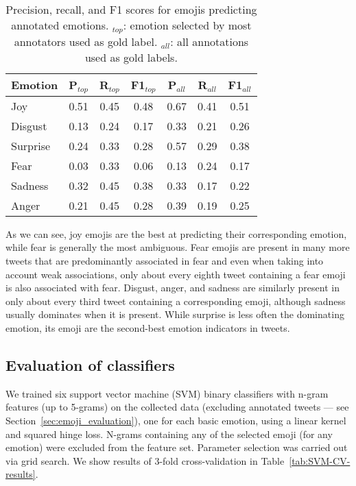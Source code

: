 \documentclass[10pt, a4paper]{article}
\begin{document}
\begin{table}[!ht]
\centering
\begin{tabular}{l | c | c | c | c | c | c}
\textbf{Emotion} & \textbf{P$_{top}$} & \textbf{R$_{top}$} & \textbf{F1$_{top}$} & \textbf{P$_{all}$} & \textbf{R$_{all}$} & \textbf{F1$_{all}$} \\\hline
Joy & 0.51 & 0.45 & 0.48 & 0.67 & 0.41 & 0.51 \\
Disgust & 0.13 & 0.24 & 0.17 & 0.33 & 0.21 & 0.26 \\
Surprise & 0.24 & 0.33 & 0.28 & 0.57 & 0.29 & 0.38 \\
Fear & 0.03 & 0.33 & 0.06 & 0.13 & 0.24 & 0.17 \\
Sadness & 0.32 & 0.45 & 0.38 & 0.33 & 0.17 & 0.22 \\
Anger & 0.21 & 0.45 & 0.28 & 0.39 & 0.19 & 0.25
\end{tabular}
\caption{Precision, recall, and F1 scores for emojis predicting annotated emotions. $_{top}$: emotion selected by most annotators used as gold label. $_{all}$: all annotations used as gold labels.}
\label{tab:precision_emojis}
\end{table}

As we can see, joy emojis are the best at predicting their corresponding emotion, while fear is generally the most ambiguous. Fear emojis are present in many more tweets that are predominantly associated in fear and even when taking into account weak associations, only about every eighth tweet containing a fear emoji is also associated with fear. Disgust, anger, and sadness are similarly present in only about every third tweet containing a corresponding emoji, although sadness usually dominates when it is present. While surprise is less often the dominating emotion, its emoji are the second-best emotion indicators in tweets.

\subsection{Evaluation of classifiers}
\label{sec:classifier_evaluation}
We trained six support vector machine (SVM) binary classifiers with n-gram features (up to 5-grams) on the collected data (excluding annotated tweets --- see Section~\ref{sec:emoji_evaluation}), one for each basic emotion, using a linear kernel and squared hinge loss.
N-grams containing any of the selected emoji (for any emotion) were excluded from the feature set.
Parameter selection was carried out via grid search. We show results of 3-fold cross-validation in Table~\ref{tab:SVM-CV-results}.
\end{document}
